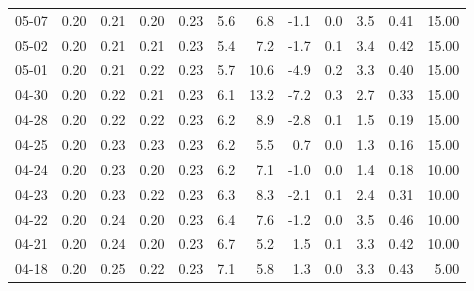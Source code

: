 \begin{threeparttable}
{\begin{tabular}{lrrrrrrrrrrr}
  05-07 &          0.20 &          0.21 &          0.20 &        0.23 &                 5.6 &                 6.8 &       -1.1 &                 0.0 &              3.5 &            0.41 &                  15.00 \\
  05-02 &          0.20 &          0.21 &          0.21 &        0.23 &                 5.4 &                 7.2 &       -1.7 &                 0.1 &              3.4 &            0.42 &                  15.00 \\
  05-01 &          0.20 &          0.21 &          0.22 &        0.23 &                 5.7 &                10.6 &       -4.9 &                 0.2 &              3.3 &            0.40 &                  15.00 \\
  04-30 &          0.20 &          0.22 &          0.21 &        0.23 &                 6.1 &                13.2 &       -7.2 &                 0.3 &              2.7 &            0.33 &                  15.00 \\
  04-28 &          0.20 &          0.22 &          0.22 &        0.23 &                 6.2 &                 8.9 &       -2.8 &                 0.1 &              1.5 &            0.19 &                  15.00 \\
  04-25 &          0.20 &          0.23 &          0.23 &        0.23 &                 6.2 &                 5.5 &        0.7 &                 0.0 &              1.3 &            0.16 &                  15.00 \\
  04-24 &          0.20 &          0.23 &          0.20 &        0.23 &                 6.2 &                 7.1 &       -1.0 &                 0.0 &              1.4 &            0.18 &                  10.00 \\
  04-23 &          0.20 &          0.23 &          0.22 &        0.23 &                 6.3 &                 8.3 &       -2.1 &                 0.1 &              2.4 &            0.31 &                  10.00 \\
  04-22 &          0.20 &          0.24 &          0.20 &        0.23 &                 6.4 &                 7.6 &       -1.2 &                 0.0 &              3.5 &            0.46 &                  10.00 \\
  04-21 &          0.20 &          0.24 &          0.20 &        0.23 &                 6.7 &                 5.2 &        1.5 &                 0.1 &              3.3 &            0.42 &                  10.00 \\
  04-18 &          0.20 &          0.25 &          0.22 &        0.23 &                 7.1 &                 5.8 &        1.3 &                 0.0 &              3.3 &            0.43 &                   5.00 \\

\end{tabular}}
\end{threeparttable}
